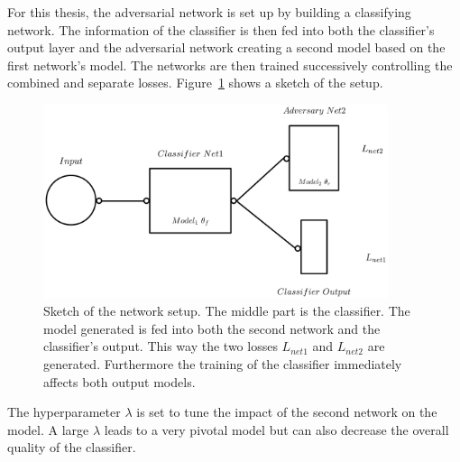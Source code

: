 For this thesis, the adversarial network is set up by building a classifying network. The information of the classifier is then fed into both the classifier's output layer and the adversarial network creating a second model based on the first network's model. The networks are then trained successively controlling the combined and separate losses. Figure~\ref{fig:ANN_sketch} shows a sketch of the setup.
%
\begin{figure}[htbp]
	\centering
	\includegraphics[width=0.9\textwidth]{figures_ML/ANN_sketch.png}
	\caption[Adversarial setup sketched]{Sketch of the network setup. The middle part is the classifier. The model generated is fed into both the second network and the classifier's output. This way the two losses $L_{net1}$ and $L_{net2}$ are generated. Furthermore the training of the classifier immediately affects both output models.}
	\label{fig:ANN_sketch}
\end{figure}
%
The hyperparameter $\lambda$ is set to tune the impact of the second network on the model. A large $\lambda$ leads to a very pivotal model but can also decrease the overall quality of the classifier.

